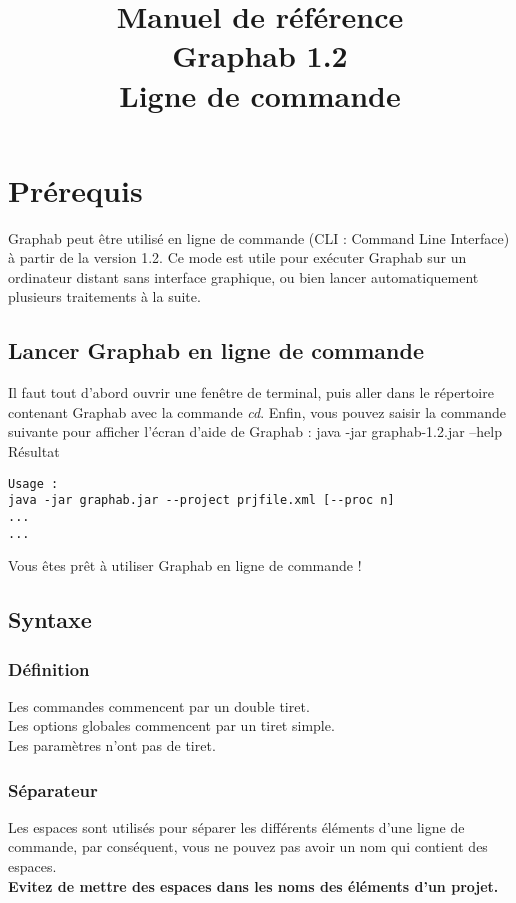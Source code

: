 \documentclass[a4paper,10pt]{report}
\title{Manuel de référence\\
Graphab 1.2\\
Ligne de commande}
\newenvironment{cmd}
{\quote\Verbatim}
{\endVerbatim\endquote}
\begin{document}
\maketitle


\parindent 0pt

\tableofcontents

\chapter{Prérequis}

Graphab peut être utilisé en ligne de commande (CLI : Command Line Interface) à partir de la version 1.2.
Ce mode est utile pour exécuter Graphab sur un ordinateur distant sans interface graphique, ou bien lancer automatiquement plusieurs traitements à la suite.

\section{Lancer Graphab en ligne de commande}
Il faut tout d'abord ouvrir une fenêtre de terminal, puis aller dans le répertoire contenant Graphab avec la commande \textit{cd}.
Enfin, vous pouvez saisir la commande suivante pour afficher l'écran d'aide de Graphab :
\begin{cmd}
java -jar graphab-1.2.jar --help
\end{cmd}
Résultat
\begin{verbatim}
Usage :
java -jar graphab.jar --project prjfile.xml [--proc n]
...
...
\end{verbatim}
Vous êtes prêt à utiliser Graphab en ligne de commande !

\section{Syntaxe}
\subsection{Définition}
Les commandes commencent par un double tiret.\\
Les options globales commencent par un tiret simple.\\
Les paramètres n'ont pas de tiret.
\subsection{Séparateur}
Les espaces sont utilisés pour séparer les différents éléments d'une ligne de commande, par conséquent, vous ne pouvez pas avoir un nom qui contient des espaces.\\
\textbf{Evitez de mettre des espaces dans les noms des éléments d'un projet.}
\end{document}
